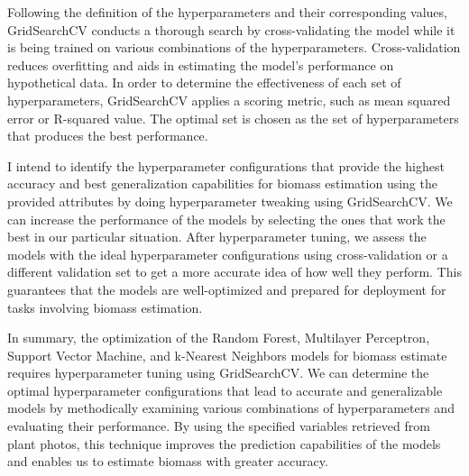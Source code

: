 \documentclass[a4paper,11pt]{report}%
\renewcommand{\\}{\vspace*{0.5\baselineskip} \newline}
\begin{document}
\noindent Following the definition of the hyperparameters and their corresponding values, GridSearchCV conducts a thorough search by cross-validating the model while it is being trained on various combinations of the hyperparameters. Cross-validation reduces overfitting and aids in estimating the model's performance on hypothetical data.
In order to determine the effectiveness of each set of hyperparameters, GridSearchCV applies a scoring metric, such as mean squared error or R-squared value. The optimal set is chosen as the set of hyperparameters that produces the best performance.

\noindent I intend to identify the hyperparameter configurations that provide the highest accuracy and best generalization capabilities for biomass estimation using the provided attributes by doing hyperparameter tweaking using GridSearchCV. We can increase the performance of the models by selecting the ones that work the best in our particular situation.
After hyperparameter tuning, we assess the models with the ideal hyperparameter configurations using cross-validation or a different validation set to get a more accurate idea of how well they perform. This guarantees that the models are well-optimized and prepared for deployment for tasks involving biomass estimation.

\noindent In summary, the optimization of the Random Forest, Multilayer Perceptron, Support Vector Machine, and k-Nearest Neighbors models for biomass estimate requires hyperparameter tuning using GridSearchCV. We can determine the optimal hyperparameter configurations that lead to accurate and generalizable models by methodically examining various combinations of hyperparameters and evaluating their performance. By using the specified variables retrieved from plant photos, this technique improves the prediction capabilities of the models and enables us to estimate biomass with greater accuracy.
\end{document}
